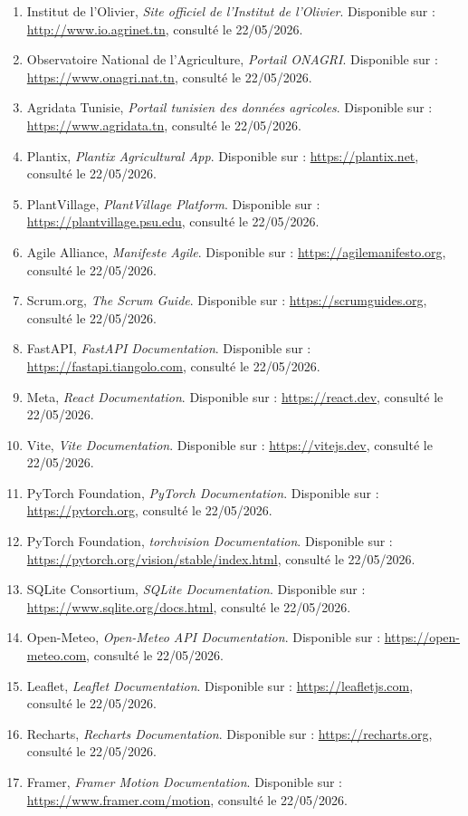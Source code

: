 \documentclass[12pt,a4paper]{report}
\begin{document}
\begin{enumerate}
    \item Institut de l'Olivier, \textit{Site officiel de l'Institut de l'Olivier}. Disponible sur : \url{http://www.io.agrinet.tn}, consulté le 22/05/2026.
    \item Observatoire National de l'Agriculture, \textit{Portail ONAGRI}. Disponible sur : \url{https://www.onagri.nat.tn}, consulté le 22/05/2026.
    \item Agridata Tunisie, \textit{Portail tunisien des données agricoles}. Disponible sur : \url{https://www.agridata.tn}, consulté le 22/05/2026.
    \item Plantix, \textit{Plantix Agricultural App}. Disponible sur : \url{https://plantix.net}, consulté le 22/05/2026.
    \item PlantVillage, \textit{PlantVillage Platform}. Disponible sur : \url{https://plantvillage.psu.edu}, consulté le 22/05/2026.
    \item Agile Alliance, \textit{Manifeste Agile}. Disponible sur : \url{https://agilemanifesto.org}, consulté le 22/05/2026.
    \item Scrum.org, \textit{The Scrum Guide}. Disponible sur : \url{https://scrumguides.org}, consulté le 22/05/2026.
    \item FastAPI, \textit{FastAPI Documentation}. Disponible sur : \url{https://fastapi.tiangolo.com}, consulté le 22/05/2026.
    \item Meta, \textit{React Documentation}. Disponible sur : \url{https://react.dev}, consulté le 22/05/2026.
    \item Vite, \textit{Vite Documentation}. Disponible sur : \url{https://vitejs.dev}, consulté le 22/05/2026.
    \item PyTorch Foundation, \textit{PyTorch Documentation}. Disponible sur : \url{https://pytorch.org}, consulté le 22/05/2026.
    \item PyTorch Foundation, \textit{torchvision Documentation}. Disponible sur : \url{https://pytorch.org/vision/stable/index.html}, consulté le 22/05/2026.
    \item SQLite Consortium, \textit{SQLite Documentation}. Disponible sur : \url{https://www.sqlite.org/docs.html}, consulté le 22/05/2026.
    \item Open-Meteo, \textit{Open-Meteo API Documentation}. Disponible sur : \url{https://open-meteo.com}, consulté le 22/05/2026.
    \item Leaflet, \textit{Leaflet Documentation}. Disponible sur : \url{https://leafletjs.com}, consulté le 22/05/2026.
    \item Recharts, \textit{Recharts Documentation}. Disponible sur : \url{https://recharts.org}, consulté le 22/05/2026.
    \item Framer, \textit{Framer Motion Documentation}. Disponible sur : \url{https://www.framer.com/motion}, consulté le 22/05/2026.
\end{enumerate}
\end{document}
